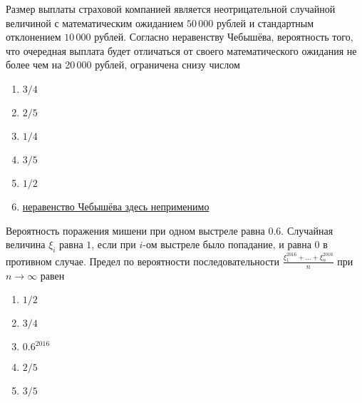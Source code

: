 \documentclass[t]{beamer}
\begin{document}
 \begin{frame} \label{20} 
\begin{block}{20} 

  Размер выплаты страховой компанией является неотрицательной случайной величиной с математическим ожиданием $50\,000$ рублей и стандартным отклонением $10\,000$ рублей. Согласно неравенству Чебышёва, вероятность того, что очередная выплата будет отличаться от своего математического ожидания не более чем на 20\,000 рублей, ограничена снизу числом
  


 \end{block} 
\begin{enumerate} 
\item[] \hyperlink{20-Yes}{\beamergotobutton{} $3/4$}
\item[] \hyperlink{20-No}{\beamergotobutton{} $2/5$}
\item[] \hyperlink{20-No}{\beamergotobutton{} $1/4$}
\item[] \hyperlink{20-No}{\beamergotobutton{} $3/5$}
\item[] \hyperlink{20-No}{\beamergotobutton{} $1/2$}
\item[] \hyperlink{20-No}{\beamergotobutton{} неравенство Чебышёва здесь неприменимо}
\end{enumerate} 
\end{frame} 


 \begin{frame} \label{21} 
\begin{block}{21} 

  Вероятность поражения мишени при одном выстреле равна $0.6$. Случайная величина $\xi_i$  равна $1$, если при $i$-ом выстреле было попадание, и равна $0$ в противном случае. Предел по вероятности последовательности $\frac{\xi_1^{2016} + \ldots + \xi_n^{2016}}{n}$ при $n \rightarrow \infty$ равен
  


 \end{block} 
\begin{enumerate} 
\item[] \hyperlink{21-No}{\beamergotobutton{} $1/2$}
\item[] \hyperlink{21-No}{\beamergotobutton{} $3/4$}
\item[] \hyperlink{21-No}{\beamergotobutton{} $0.6^2016$}
\item[] \hyperlink{21-No}{\beamergotobutton{} $2/5$}
\item[] \hyperlink{21-Yes}{\beamergotobutton{} $3/5$}
\end{enumerate} 
\end{frame} 
\end{document}
